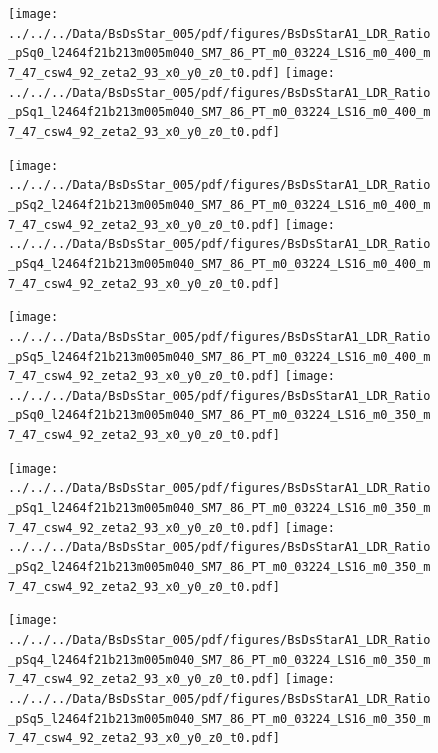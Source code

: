 \documentclass[a4paper,10pt]{article}
\begin{document}
\begin{figure}[p]
 \texttt{[image: ../../../Data/BsDsStar\_005/pdf/figures/BsDsStarA1\_LDR\_Ratio\_pSq0\_l2464f21b213m005m040\_SM7\_86\_PT\_m0\_03224\_LS16\_m0\_400\_m7\_47\_csw4\_92\_zeta2\_93\_x0\_y0\_z0\_t0.pdf]} 
 \texttt{[image: ../../../Data/BsDsStar\_005/pdf/figures/BsDsStarA1\_LDR\_Ratio\_pSq1\_l2464f21b213m005m040\_SM7\_86\_PT\_m0\_03224\_LS16\_m0\_400\_m7\_47\_csw4\_92\_zeta2\_93\_x0\_y0\_z0\_t0.pdf]} 
 \end{figure}
\begin{figure}[p]
 \texttt{[image: ../../../Data/BsDsStar\_005/pdf/figures/BsDsStarA1\_LDR\_Ratio\_pSq2\_l2464f21b213m005m040\_SM7\_86\_PT\_m0\_03224\_LS16\_m0\_400\_m7\_47\_csw4\_92\_zeta2\_93\_x0\_y0\_z0\_t0.pdf]} 
 \texttt{[image: ../../../Data/BsDsStar\_005/pdf/figures/BsDsStarA1\_LDR\_Ratio\_pSq4\_l2464f21b213m005m040\_SM7\_86\_PT\_m0\_03224\_LS16\_m0\_400\_m7\_47\_csw4\_92\_zeta2\_93\_x0\_y0\_z0\_t0.pdf]} 
 \end{figure}
\begin{figure}[p]
 \texttt{[image: ../../../Data/BsDsStar\_005/pdf/figures/BsDsStarA1\_LDR\_Ratio\_pSq5\_l2464f21b213m005m040\_SM7\_86\_PT\_m0\_03224\_LS16\_m0\_400\_m7\_47\_csw4\_92\_zeta2\_93\_x0\_y0\_z0\_t0.pdf]} 
 \texttt{[image: ../../../Data/BsDsStar\_005/pdf/figures/BsDsStarA1\_LDR\_Ratio\_pSq0\_l2464f21b213m005m040\_SM7\_86\_PT\_m0\_03224\_LS16\_m0\_350\_m7\_47\_csw4\_92\_zeta2\_93\_x0\_y0\_z0\_t0.pdf]} 
 \end{figure}
\clearpage
\begin{figure}[p]
 \texttt{[image: ../../../Data/BsDsStar\_005/pdf/figures/BsDsStarA1\_LDR\_Ratio\_pSq1\_l2464f21b213m005m040\_SM7\_86\_PT\_m0\_03224\_LS16\_m0\_350\_m7\_47\_csw4\_92\_zeta2\_93\_x0\_y0\_z0\_t0.pdf]} 
 \texttt{[image: ../../../Data/BsDsStar\_005/pdf/figures/BsDsStarA1\_LDR\_Ratio\_pSq2\_l2464f21b213m005m040\_SM7\_86\_PT\_m0\_03224\_LS16\_m0\_350\_m7\_47\_csw4\_92\_zeta2\_93\_x0\_y0\_z0\_t0.pdf]} 
 \end{figure}
\begin{figure}[p]
 \texttt{[image: ../../../Data/BsDsStar\_005/pdf/figures/BsDsStarA1\_LDR\_Ratio\_pSq4\_l2464f21b213m005m040\_SM7\_86\_PT\_m0\_03224\_LS16\_m0\_350\_m7\_47\_csw4\_92\_zeta2\_93\_x0\_y0\_z0\_t0.pdf]} 
 \texttt{[image: ../../../Data/BsDsStar\_005/pdf/figures/BsDsStarA1\_LDR\_Ratio\_pSq5\_l2464f21b213m005m040\_SM7\_86\_PT\_m0\_03224\_LS16\_m0\_350\_m7\_47\_csw4\_92\_zeta2\_93\_x0\_y0\_z0\_t0.pdf]} 
 \end{figure}
\end{document}
